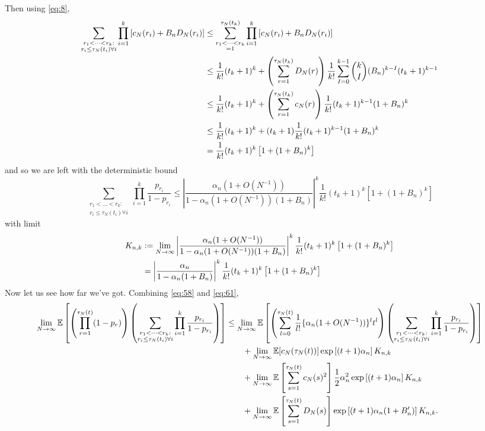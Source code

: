 \documentclass{article}
\newcommand{\E}{\mathbb{E}}
\newcommand{\1}[1]{\mathbbm{1}_{#1}}
\begin{document}
Then using \eqref{eq:8},
\begin{align}
\sum_{\substack{r_1<\dots<r_k :\\ r_i\leq \tau_N(t_i) \forall i}} \prod_{i=1}^k
\left[ c_N(r_i) + B_n D_N(r_i) \right] 
&\leq \sum_{\substack{r_1<\dots<r_k \\ =1}}^{\tau_N(t_k)} \prod_{i=1}^k
\left[ c_N(r_i) + B_n D_N(r_i) \right] \notag\\
&\leq \frac{1}{k!} (t_k +1)^k + \left( \sum_{r=1}^{\tau_N(t_k)} D_N(r) \right)
\frac{1}{k!} \sum_{I=0}^{k-1} \binom{k}{I} (B_n)^{k-I} (t_k +1)^{k-1} \notag\\
&\leq \frac{1}{k!} (t_k +1)^k + \left( \sum_{r=1}^{\tau_N(t_k)} c_N(r) \right)
\frac{1}{k!} (t_k +1)^{k-1} (1+B_n)^k \notag\\
&\leq \frac{1}{k!} (t_k +1)^k + (t_k +1)
\frac{1}{k!} (t_k +1)^{k-1} (1+B_n)^k \notag\\
&= \frac{1}{k!} (t_k +1)^k \left[ 1+(1+B_n)^k \right] 
\end{align}
and so we are left with the deterministic bound
\begin{equation}\label{eq:61}
\sum_{\substack{r_1<\dots<r_k :\\ r_i\leq \tau_N(t_i) \forall i}} \prod_{i=1}^k \frac{p_{r_i}}{1-p_{r_i}}
\leq \left| \frac{\alpha_n (1+O(N^{-1})) }{1- \alpha_n (1+O(N^{-1})) (1+ B_n) } \right|^k \frac{1}{k!} (t_k +1)^k \left[ 1+(1+B_n)^k \right] 
\end{equation}
with limit 
\begin{align}
K_{n,k} 
&:= \lim_{N\to\infty} \left| \frac{\alpha_n (1+O(N^{-1})) }{1- \alpha_n (1+O(N^{-1})) (1+ B_n) } \right|^k \frac{1}{k!} (t_k +1)^k \left[ 1+(1+B_n)^k \right] \notag\\
&= \left| \frac{\alpha_n }{1- \alpha_n (1+ B_n) } \right|^k \frac{1}{k!} (t_k +1)^k \left[ 1+(1+B_n)^k \right] \label{eq:62}
\end{align}
Now let us see how far we've got. Combining \eqref{eq:58} and \eqref{eq:61},
\begin{align}
\lim_{N\to\infty} \E \left[ \left( \prod_{r=1}^{\tau_N(t)} (1-p_r) \right) \left( \sum_{\substack{r_1<\dots<r_k :\\ r_i\leq \tau_N(t_i) \forall i}} \prod_{i=1}^k \frac{p_{r_i}}{1-p_{r_i}} \right) \right] 
&\leq \lim_{N\to\infty} \E \left[ \left( \sum_{l=0}^{\tau_N(t)} \frac{1}{l!} \{\alpha_n (1+O(N^{-1})) \}^l t^l \right) \left( \sum_{\substack{r_1<\dots<r_k :\\ r_i\leq \tau_N(t_i) \forall i}} \prod_{i=1}^k \frac{p_{r_i}}{1-p_{r_i}} \right) \right] \notag\\
&\qquad+ \lim_{N\to\infty} \E [c_N(\tau_N(t))] \exp \left[ (t+1) \alpha_n  \right] K_{n,k} \notag\\
&\qquad+ \lim_{N\to\infty} \E \left[ \sum_{s=1}^{\tau_N(t)} c_N(s)^2 \right] 
\frac{1}{2} \alpha_n^2
\exp\left[ (t+1) \alpha_n \right] K_{n,k} \notag\\
&\qquad+ \lim_{N\to\infty} \E \left[ \sum_{s=1}^{\tau_N(t)} D_N(s) \right]
\exp \left[ (t+1) \alpha_n (1+B_n^\prime) \right] K_{n,k} .
\end{align}
\end{document}
